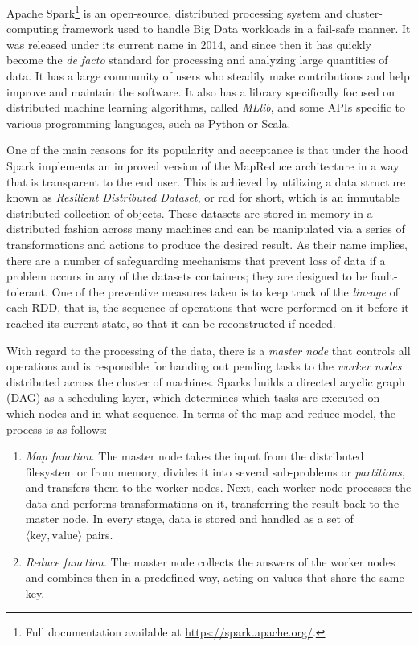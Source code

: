Apache Spark\footnote{Full documentation available at \url{https://spark.apache.org/}.} is an open-source, distributed processing system and cluster-computing framework used to handle Big Data workloads in a fail-safe manner. It was released under its current name in 2014, and since then it has quickly become the \textit{de facto} standard for processing and analyzing large quantities of data. It has a large community of users who steadily make contributions and help improve and maintain the software. It also has a library specifically focused on distributed machine learning algorithms, called \textit{MLlib}, and some APIs specific to various programming languages, such as Python or Scala.

One of the main reasons for its popularity and acceptance is that under the hood Spark implements an improved version of the MapReduce architecture in a way that is transparent to the end user. This is achieved by utilizing a data structure known as \textit{Resilient Distributed Dataset}, or \acrshort{rdd} for short, which is an immutable distributed collection of objects. These datasets are stored in memory in a distributed fashion across many machines and can be manipulated via a series of transformations and actions to produce the desired result. As their name implies, there are a number of safeguarding mechanisms that prevent loss of data if a problem occurs in any of the datasets containers; they are designed to be fault-tolerant. One of the preventive measures taken is to keep track of the \textit{lineage} of each RDD, that is, the sequence of operations that were performed on it before it reached its current state, so that it can be reconstructed if needed.

With regard to the processing of the data, there is a \textit{master node} that controls all operations and is responsible for handing out pending tasks to the \textit{worker nodes} distributed across the cluster of machines. Sparks builds a directed acyclic graph (DAG) as a scheduling layer, which determines which tasks are executed on which nodes and in what sequence. In terms of the map-and-reduce model, the process is as follows:

\begin{enumerate}[1.]
  \item \textit{Map function}. The master node takes the input from the distributed filesystem or from memory, divides it into several sub-problems or \textit{partitions}, and transfers them to the worker nodes. Next, each worker node processes the data and performs transformations on it, transferring the result back to the master node. In every stage, data is stored and handled as a set of $\langle \text{key},\text{value}\rangle$ pairs.
  \item \textit{Reduce function}. The master node collects the answers of the worker nodes and combines then in a predefined way, acting on values that share the same key.
\end{enumerate}

